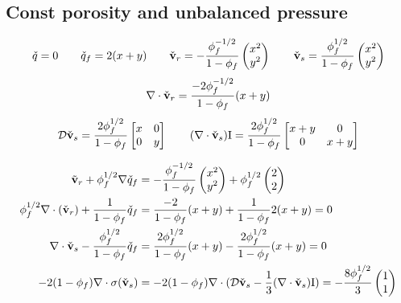 \subsection{Const porosity and unbalanced pressure}
\begin{equation}
\check{q} = 0 \quad \quad \check{q}_f = 2(x+y) \quad \quad 
\check{\bold{v}}_r = -\frac{\phi_f^{-1/2}}{1-\phi_f}\begin{pmatrix}x^2 \\ y^2 \end{pmatrix} 
\quad \quad \check{\bold{v}}_s = \frac{\phi_f^{1/2}}{1-\phi_f} \begin{pmatrix}x^2 \\ y^2 \end{pmatrix}
\end{equation}
\begin{equation}
\nabla \cdot \check{\bold{v}}_r = \frac{-2\phi_f^{-1/2}}{1-\phi_f}(x+y) 
\end{equation}
\begin{equation}
\mathcal{D}\check{\bold{v}}_s = \frac{2\phi_f^{1/2}}{1-\phi_f}\begin{bmatrix} x & 0 \\ 0 & y \end{bmatrix}
\quad \quad 
(\nabla \cdot \check{\bold{v}}_s) \bold{\text{I}} = \frac{2\phi_f^{1/2}}{1-\phi_f} \begin{bmatrix} x+y & 0 \\ 0 & x+y \end{bmatrix}
\end{equation}

\begin{equation}
\begin{aligned}
\tilde{\bold{v}}_r + \phi_f^{1/2}\nabla\check{q}_f &= 
-\frac{\phi_f^{-1/2}}{1-\phi_f}\begin{pmatrix}x^2 \\ y^2 \end{pmatrix} + \phi_f^{1/2}\begin{pmatrix} 2 \\ 2 \end{pmatrix}\\
\phi_f^{1/2}\nabla \cdot (\check{\bold{v}}_r) + \frac{1}{1-\phi_f}\check{q}_f  &= \frac{-2}{1-\phi_f}(x+y) + \frac{1}{1-\phi_f}2(x+y)=0\\
\nabla \cdot \check{\bold{v}}_s - \frac{\phi_f^{1/2}}{1-\phi_f}\check{q}_f &= \frac{2\phi_f^{1/2}}{1-\phi_f}(x+y) - \frac{2\phi_f^{1/2}}{1-\phi_f}(x+y) = 0\\
-2(1-\phi_f)\nabla \cdot \sigma(\check{\bold{v}}_s) &= -2(1-\phi_f)\nabla \cdot (\mathcal{D}\check{\bold{v}}_s - \frac{1}{3}(\nabla \cdot \check{\bold{v}}_s) \bold{\text{I}}) = 
-\frac{8\phi_f^{1/2}}{3} \begin{pmatrix} 1 \\ 1 \end{pmatrix}
\end{aligned}
\end{equation}

\newpage




